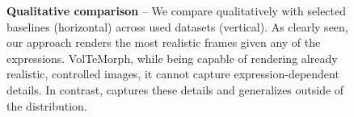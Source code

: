 {
}
\begin{figure}[t]
  \centering
  \resizebox{\linewidth}{!}{
    \versionthree
  }
  \caption{\textbf{Qualitative comparison} --
    We compare qualitatively \blendfields with selected baselines
    (horizontal) across used datasets (vertical).
    As clearly seen, our approach renders the most realistic frames given any
    of the expressions.
    VolTeMorph, while being capable of rendering already realistic, controlled
    images, it cannot capture expression-dependent details.
    In contrast, \blendfields captures these details and generalizes outside
    of the distribution.
  }
  \label{fig:blendfields-qualitative-comparison}
\end{figure}